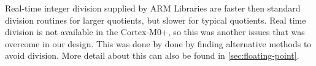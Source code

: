 Real-time integer division supplied by ARM Libraries are faster then standard division routines for larger quotients, but slower for typical  quotients. Real time division is not available in the Cortex-M0+, so this was another issues that was overcome in our design. This was done by done by finding alternative methods to avoid division. More detail about this can also be found in \ref{sec:floating-point}.